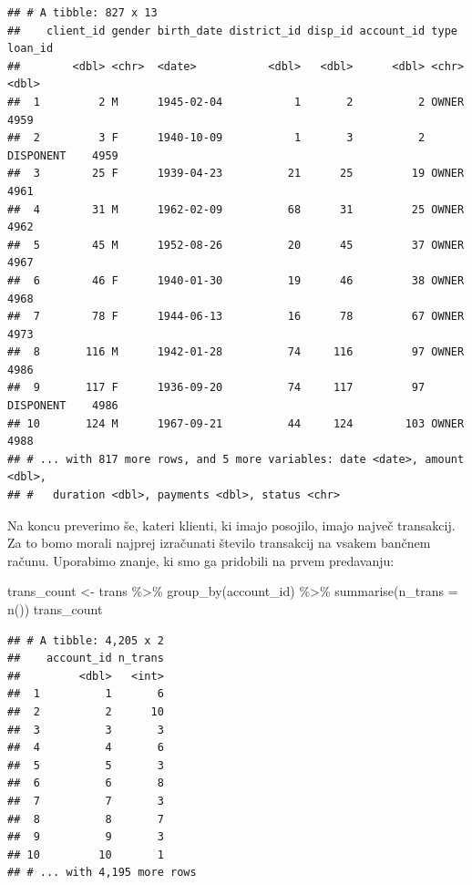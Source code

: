 \documentclass[
]{book}
\newenvironment{Shaded}{\begin{snugshade}}{\end{snugshade}}
\newcommand{\AttributeTok}[1]{\textcolor[rgb]{0.77,0.63,0.00}{#1}}
\newcommand{\FunctionTok}[1]{\textcolor[rgb]{0.00,0.00,0.00}{#1}}
\newcommand{\NormalTok}[1]{#1}
\newcommand{\OtherTok}[1]{\textcolor[rgb]{0.56,0.35,0.01}{#1}}
\newcommand{\SpecialCharTok}[1]{\textcolor[rgb]{0.00,0.00,0.00}{#1}}
\begin{document}
\begin{verbatim}
## # A tibble: 827 x 13
##    client_id gender birth_date district_id disp_id account_id type      loan_id
##        <dbl> <chr>  <date>           <dbl>   <dbl>      <dbl> <chr>       <dbl>
##  1         2 M      1945-02-04           1       2          2 OWNER        4959
##  2         3 F      1940-10-09           1       3          2 DISPONENT    4959
##  3        25 F      1939-04-23          21      25         19 OWNER        4961
##  4        31 M      1962-02-09          68      31         25 OWNER        4962
##  5        45 M      1952-08-26          20      45         37 OWNER        4967
##  6        46 F      1940-01-30          19      46         38 OWNER        4968
##  7        78 F      1944-06-13          16      78         67 OWNER        4973
##  8       116 M      1942-01-28          74     116         97 OWNER        4986
##  9       117 F      1936-09-20          74     117         97 DISPONENT    4986
## 10       124 M      1967-09-21          44     124        103 OWNER        4988
## # ... with 817 more rows, and 5 more variables: date <date>, amount <dbl>,
## #   duration <dbl>, payments <dbl>, status <chr>
\end{verbatim}

Na koncu preverimo še, kateri klienti, ki imajo posojilo, imajo največ transakcij. Za to bomo morali najprej izračunati število transakcij na vsakem bančnem računu. Uporabimo znanje, ki smo ga pridobili na prvem predavanju:

\begin{Shaded}
\begin{Highlighting}[]
\NormalTok{trans\_count }\OtherTok{\textless{}{-}}\NormalTok{ trans }\SpecialCharTok{\%\textgreater{}\%}
  \FunctionTok{group\_by}\NormalTok{(account\_id) }\SpecialCharTok{\%\textgreater{}\%}
  \FunctionTok{summarise}\NormalTok{(}\AttributeTok{n\_trans =} \FunctionTok{n}\NormalTok{())}
\NormalTok{trans\_count}
\end{Highlighting}
\end{Shaded}

\begin{verbatim}
## # A tibble: 4,205 x 2
##    account_id n_trans
##         <dbl>   <int>
##  1          1       6
##  2          2      10
##  3          3       3
##  4          4       6
##  5          5       3
##  6          6       8
##  7          7       3
##  8          8       7
##  9          9       3
## 10         10       1
## # ... with 4,195 more rows
\end{verbatim}
\end{document}
